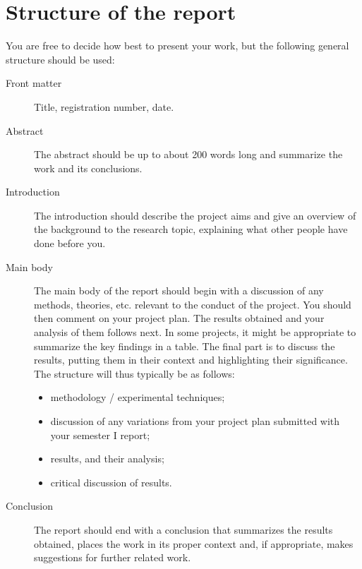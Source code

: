 \documentclass[aps,pra,twocolumn]{revtex4-2}
\begin{document}





\section{Structure of the report}

You are free to decide how best to present your work, but the following general structure should be used:

\begin{description}
\item[Front matter]	Title, registration number, date.

\item[Abstract]	The abstract should be up to about 200 words long and summarize the work and its conclusions. 

\item[Introduction]	The introduction should describe the project aims and give an overview of the background to the research topic, explaining what other people have done before you. 

\item[Main body] The main body of the report should begin with a discussion of any methods, theories, etc. relevant to the conduct of the project. You should then comment on your project plan. The results obtained and your analysis of them follows next. In some projects, it might be appropriate to summarize the key findings in a table. The final part is to discuss the results, putting them in their context and highlighting their significance. The structure will thus typically be as follows:
\begin{itemize}
\item methodology / experimental techniques;
\item discussion of any variations from your project plan submitted with your semester I report;
\item results, and their analysis;
\item critical discussion of results.
\end{itemize}

\item[Conclusion]	The report should end with a conclusion that summarizes the results obtained, places the work in its proper context and, if appropriate, makes suggestions for further related work. 


\end{description}
\end{document}
